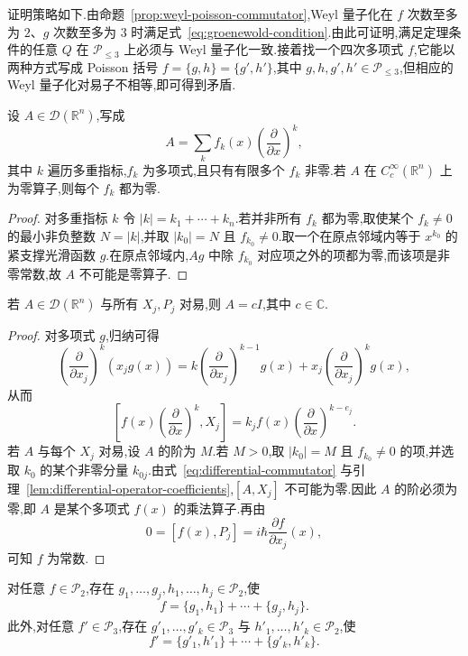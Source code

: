 {证明策略如下.由命题~\ref{prop:weyl-poisson-commutator},Weyl 量子化在 $f$ 次数至多为 $2$、$g$ 次数至多为 $3$ 时满足式~\eqref{eq:groenewold-condition}.由此可证明,满足定理条件的任意 $Q$ 在 $\mathcal P_{\leq3}$ 上必须与 Weyl 量子化一致.接着找一个四次多项式 $f$,它能以两种方式写成 Poisson 括号 $f=\{g,h\}=\{g',h'\}$,其中 $g,h,g',h'\in\mathcal P_{\leq3}$,但相应的 Weyl 量子化对易子不相等,即可得到矛盾.

\begin{lemma}[微分算子的系数唯一性]\label{lem:differential-operator-coefficients}
设 $A\in\mathcal D(\mathbb R^n)$,写成
\[
A=\sum_k f_k(x)\left(\frac{\partial}{\partial x}\right)^k,
\]
其中 $k$ 遍历多重指标,$f_k$ 为多项式,且只有有限多个 $f_k$ 非零.若 $A$ 在 $C_c^\infty(\mathbb R^n)$ 上为零算子,则每个 $f_k$ 都为零.
\end{lemma}

\begin{proof}
对多重指标 $k$ 令 $|k|=k_1+\cdots+k_n$.若并非所有 $f_k$ 都为零,取使某个 $f_k\neq0$ 的最小非负整数 $N=|k|$,并取 $|k_0|=N$ 且 $f_{k_0}\neq0$.取一个在原点邻域内等于 $x^{k_0}$ 的紧支撑光滑函数 $g$.在原点邻域内,$Ag$ 中除 $f_{k_0}$ 对应项之外的项都为零,而该项是非零常数,故 $A$ 不可能是零算子.
\end{proof}

\begin{lemma}\label{lem:differential-commutant}
若 $A\in\mathcal D(\mathbb R^n)$ 与所有 $X_j,P_j$ 对易,则 $A=cI$,其中 $c\in\mathbb C$.
\end{lemma}

\begin{proof}
对多项式 $g$,归纳可得
\[
\left(\frac{\partial}{\partial x_j}\right)^k(x_jg(x))
=k\left(\frac{\partial}{\partial x_j}\right)^{k-1}g(x)
+x_j\left(\frac{\partial}{\partial x_j}\right)^kg(x),
\]
从而
\[
\left[f(x)\left(\frac{\partial}{\partial x}\right)^k,X_j\right]
=k_jf(x)\left(\frac{\partial}{\partial x}\right)^{k-e_j}.
\label{eq:differential-commutator}
\]
若 $A$ 与每个 $X_j$ 对易,设 $A$ 的阶为 $M$.若 $M>0$,取 $|k_0|=M$ 且 $f_{k_0}\neq0$ 的项,并选取 $k_0$ 的某个非零分量 $k_{0j}$.由式~\eqref{eq:differential-commutator} 与引理~\ref{lem:differential-operator-coefficients},$[A,X_j]$ 不可能为零.因此 $A$ 的阶必须为零,即 $A$ 是某个多项式 $f(x)$ 的乘法算子.再由
\[
0=[f(x),P_j]=i\hbar\frac{\partial f}{\partial x_j}(x),
\]
可知 $f$ 为常数.
\end{proof}

\begin{lemma}\label{lem:poisson-bracket-decomposition}
对任意 $f\in\mathcal P_2$,存在 $g_1,\ldots,g_j,h_1,\ldots,h_j\in\mathcal P_2$,使
\[
f=\{g_1,h_1\}+\cdots+\{g_j,h_j\}.
\]
此外,对任意 $f'\in\mathcal P_3$,存在 $g'_1,\ldots,g'_k\in\mathcal P_3$ 与 $h'_1,\ldots,h'_k\in\mathcal P_2$,使
\[
f'=\{g'_1,h'_1\}+\cdots+\{g'_k,h'_k\}.
\]
\end{lemma}

}
